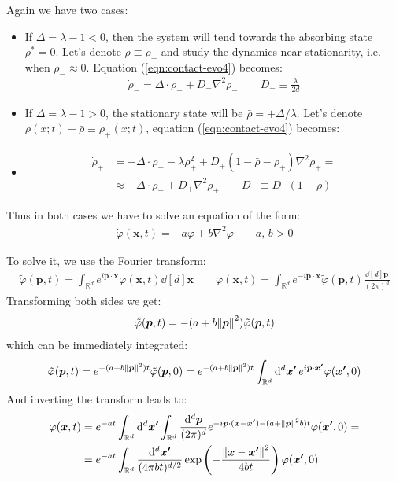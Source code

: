 \documentclass[../../main.tex]{subfiles}
\begin{document}
\medskip

Again we have two cases:
\begin{itemize}
    \item If $\Delta = \lambda -1 < 0$, then the system will tend towards the absorbing state $\rho^* = 0$. Let's denote $\rho \equiv \rho_-$ and study the dynamics near stationarity, i.e. when $\rho_- \approx 0$. Equation (\ref{eqn:contact-evo4}) becomes:
    \begin{align*}
        \dot{\rho}_- = \Delta \cdot \rho_- + D_- \nabla^2 \rho_- \qquad D_- \equiv \frac{\lambda}{2d} 
    \end{align*}
    \item If $\Delta = \lambda -1 > 0$, the stationary state will be $\bar{\rho} = +\Delta/\lambda$. Let's denote $\rho(x;t) - \bar{\rho} \equiv \rho_+(x;t)$, equation (\ref{eqn:contact-evo4}) becomes:
    \item \begin{align*}
        \dot{\rho}_+ &= - \Delta \cdot \rho_+ - \lambda \rho_+^2 + D_+(1-\bar{\rho} - \rho_+) \nabla^2 \rho_+ =\\
        &\approx -\Delta \cdot \rho_+ + D_+ \nabla^2 \rho_+ \qquad D_+ \equiv D_- (1  - \bar{\rho})
    \end{align*}%
\end{itemize}

Thus in both cases we have to solve an equation of the form:
\begin{align*}
    \dot{\varphi}(\bm{x},t) = - a \varphi + b \nabla^2 \varphi \qquad a,\, b > 0
\end{align*}%

To solve it, we use the Fourier transform:
\begin{align*}
    \tilde{\varphi}(\bm{p}, t) = \int_{\mathbb{R}^d} e^{i \bm{p} \cdot \bm{x}} \varphi(\bm{x}, t) \dd[d]{\bm{x}} \qquad \varphi(\bm{x},t) = \int_{\mathbb{R}^d} e^{-i \bm{p}\cdot \bm{x}} \tilde{\varphi}(\bm{p},t) \frac{\dd[d]{\bm{p}}}{(2 \pi)^d} 
\end{align*}
Transforming both sides we get:
\begin{align*}
    \dot{\tilde{\varphi}}(\bm{p}, t) = - (a + b \norm{\bm{p}}^2 ) \tilde{\varphi}(\bm{p}, t)
\end{align*}
which can be immediately integrated:
\begin{align*}
    \tilde{\varphi}(\bm{p}, t) = e^{-(a+b\norm{\bm{p}}^2)t} \tilde{\varphi}(\bm{p},0) = e^{-(a + b\norm{\bm{p}}^2)t} \int_{\mathbb{R}^d} \dd[d]{\bm{x'}} e^{i \bm{p} \cdot \bm{x'}} \varphi(\bm{x'},0)
\end{align*}
And inverting the transform leads to:
\begin{align*}
    \varphi(\bm{x}, t) &= e^{-at} \int_{\mathbb{R}^d} \dd[d]{\bm{x'}} \int_{\mathbb{R}^d} \frac{\dd[d]{\bm{p}}}{(2\pi)^d} e^{-i \bm{p} \cdot (\bm{x} - \bm{x'}) - (a + \norm{\bm{p}}^2 b)t} \varphi(\bm{x'}, 0) =\\
    &= e^{-a t} \int_{\mathbb{R}^d} \frac{\dd[d]{\bm{x'}}}{(4 \pi b t)^{d/2}} \exp\left(-\frac{\norm{\bm{x} - \bm{x'}}^2}{4bt} \right) \varphi(\bm{x'},0)
\end{align*}
\end{document}
